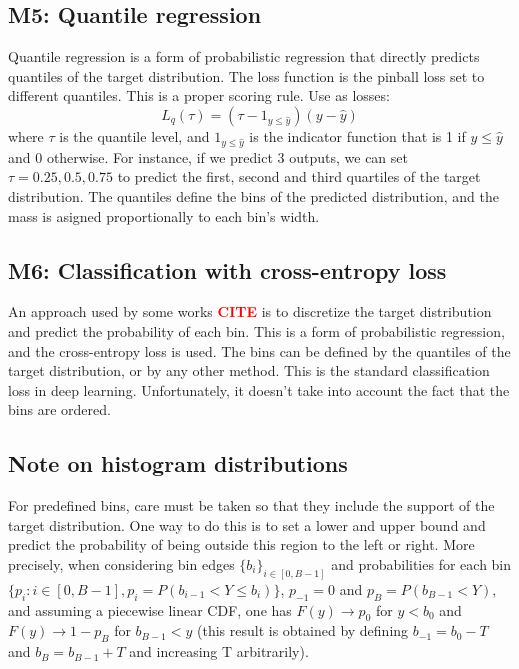 \documentclass{article}
\newcommand{\citee}[1]{\textbf{\textcolor{red}{CITE}}}
\begin{document}
\subsection{M5: Quantile regression}
Quantile regression is a form of probabilistic regression that directly predicts quantiles of the target distribution. The loss function is the pinball loss set to different quantiles. This is a proper scoring rule. Use as losses:
\begin{equation}
    L_q(\tau) = (\tau - \mathrm{1}_{y \leq \hat{y}})(y - \hat{y})
\end{equation}
where $\tau$ is the quantile level, and $\mathrm{1}_{y \leq \hat{y}}$ is the indicator function that is 1 if $y \leq \hat{y}$ and 0 otherwise. For instance, if we predict $3$ outputs, we can set $\tau = 0.25, 0.5, 0.75$ to predict the first, second and third quartiles of the target distribution. The quantiles define the bins of the predicted distribution, and the mass is asigned proportionally to each bin's width.  

\subsection{M6: Classification with cross-entropy loss}
An approach used by some works \citee, is to discretize the target distribution and predict the probability of each bin. This is a form of probabilistic regression, and the cross-entropy loss is used. The bins can be defined by the quantiles of the target distribution, or by any other method. This is the standard classification loss in deep learning. Unfortunately, it doesn't take into account the fact that the bins are ordered. 

\subsection{Note on histogram distributions}
For predefined bins, care must be taken so that they include the support of the target distribution. One way to do this is to set a lower and upper bound and predict the probability of being outside this region to the left or right. More precisely, when considering bin edges $\{b_i\}_{i\in [0, B-1]}$ and probabilities for each bin $\{p_i: i \in [0, B-1], p_i = P(b_{i-1} < Y \leq b_i)\}$, $p_{-1}=0$ and $p_B=P(b_{B-1}<Y)$, and assuming a piecewise linear CDF, one has $F(y)\to p_0$ for $y<b_0$ and $F(y)\to 1 - p_B$ for $b_{B-1}<y$ (this result is obtained by defining $b_{-1}=b_0-T$ and $b_B=b_{B-1}+T$ and increasing T arbitrarily). 
\end{document}

